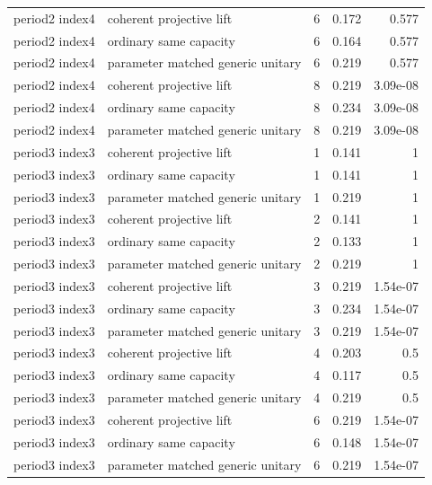 \begin{tabular}{llrrr}
period2 index4 & coherent projective lift & 6 & 0.172 & 0.577\\
period2 index4 & ordinary same capacity & 6 & 0.164 & 0.577\\
period2 index4 & parameter matched generic unitary & 6 & 0.219 & 0.577\\
period2 index4 & coherent projective lift & 8 & 0.219 & 3.09e-08\\
period2 index4 & ordinary same capacity & 8 & 0.234 & 3.09e-08\\
period2 index4 & parameter matched generic unitary & 8 & 0.219 & 3.09e-08\\
period3 index3 & coherent projective lift & 1 & 0.141 & 1\\
period3 index3 & ordinary same capacity & 1 & 0.141 & 1\\
period3 index3 & parameter matched generic unitary & 1 & 0.219 & 1\\
period3 index3 & coherent projective lift & 2 & 0.141 & 1\\
period3 index3 & ordinary same capacity & 2 & 0.133 & 1\\
period3 index3 & parameter matched generic unitary & 2 & 0.219 & 1\\
period3 index3 & coherent projective lift & 3 & 0.219 & 1.54e-07\\
period3 index3 & ordinary same capacity & 3 & 0.234 & 1.54e-07\\
period3 index3 & parameter matched generic unitary & 3 & 0.219 & 1.54e-07\\
period3 index3 & coherent projective lift & 4 & 0.203 & 0.5\\
period3 index3 & ordinary same capacity & 4 & 0.117 & 0.5\\
period3 index3 & parameter matched generic unitary & 4 & 0.219 & 0.5\\
period3 index3 & coherent projective lift & 6 & 0.219 & 1.54e-07\\
period3 index3 & ordinary same capacity & 6 & 0.148 & 1.54e-07\\
period3 index3 & parameter matched generic unitary & 6 & 0.219 & 1.54e-07\\
\bottomrule
\end{tabular}

